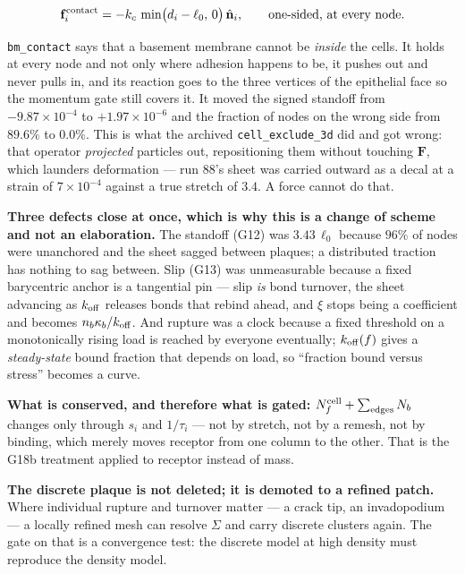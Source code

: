 \documentclass[10pt,a4paper]{article}
\newcommand{\op}[1]{\texttt{#1}}
\begin{document}
\begin{equation}
\mathbf f^{\rm contact}_i=-k_c\,\min\bigl(d_i-\ell_0,\,0\bigr)\,\hat{\mathbf n}_i,
\qquad\text{one-sided, at every node.}
\label{eq:contact}
\end{equation}

\op{bm\_contact} says that a basement membrane cannot be \emph{inside} the cells. It holds at every
node and not only where adhesion happens to be, it pushes out and never pulls in, and its reaction goes
to the three vertices of the epithelial face so the momentum gate still covers it. It moved the signed
standoff from $-9.87\times10^{-4}$ to $+1.97\times10^{-6}$ and the fraction of nodes on the wrong side
from $89.6\%$ to $\mathbf{0.0\%}$. This is what the archived \op{cell\_exclude\_3d} did and got wrong:
that operator \emph{projected} particles out, repositioning them without touching $\mathbf F$, which
launders deformation --- run 88's sheet was carried outward as a decal at a strain of
$7\times10^{-4}$ against a true stretch of $3.4$. A force cannot do that.

\textbf{Three defects close at once, which is why this is a change of scheme and not an elaboration.}
The standoff (G12) was $3.43\,\ell_0$ because $96\%$ of nodes were unanchored and the sheet sagged
between plaques; a distributed traction has nothing to sag between. Slip (G13) was unmeasurable because
a fixed barycentric anchor is a tangential pin --- slip \emph{is} bond turnover, the sheet advancing as
$k_{\rm off}$ releases bonds that rebind ahead, and $\xi$ stops being a coefficient and becomes
$n_b\kappa_b/k_{\rm off}$. And rupture was a clock because a fixed threshold on a monotonically rising
load is reached by everyone eventually; $k_{\rm off}(f)$ gives a \emph{steady-state} bound fraction
that depends on load, so ``fraction bound versus stress'' becomes a curve.

\textbf{What is conserved, and therefore what is gated:} $N_f^{\rm cell}+\sum_{\rm edges}N_b$ changes
only through $s_i$ and $1/\tau_i$ --- not by stretch, not by a remesh, not by binding, which merely
moves receptor from one column to the other. That is the G18b treatment applied to receptor instead of
mass.

\textbf{The discrete plaque is not deleted; it is demoted to a refined patch.} Where individual rupture
and turnover matter --- a crack tip, an invadopodium --- a locally refined mesh can resolve $\Sigma$
and carry discrete clusters again. The gate on that is a convergence test: the discrete model at high
density must reproduce the density model.
\end{document}
